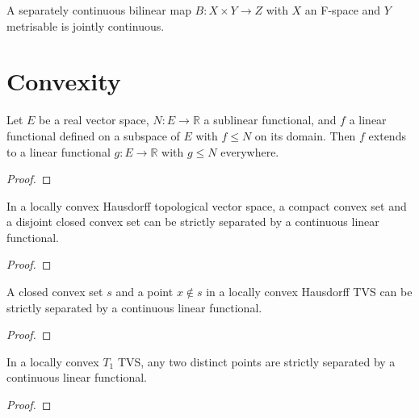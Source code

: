 \begin{theorem}
  \label{thm:bilinear-cont-of-separately}
  \leanok
  A separately continuous bilinear map $B : X \times Y \to Z$ with
  $X$ an F-space and $Y$ metrisable is jointly continuous.
\end{theorem}

\chapter{Convexity}

\begin{theorem}
  \label{thm:hahn-banach-analytic}
  \leanok
  Let $E$ be a real vector space, $N\colon E \to \mathbb{R}$ a sublinear
  functional, and $f$ a linear functional defined on a subspace of $E$
  with $f \le N$ on its domain. Then $f$ extends to a linear functional
  $g\colon E \to \mathbb{R}$ with $g \le N$ everywhere.
\end{theorem}
\begin{proof}
  \leanok
\end{proof}

\begin{theorem}
  \label{thm:hahn-banach-separation}
  \leanok
  In a locally convex Hausdorff topological vector space, a compact
  convex set and a disjoint closed convex set can be strictly separated
  by a continuous linear functional.
\end{theorem}
\begin{proof}
  \leanok
\end{proof}

\begin{theorem}
  \label{thm:hahn-banach-closed-point}
  \leanok
  A closed convex set $s$ and a point $x \notin s$ in a locally convex
  Hausdorff TVS can be strictly separated by a continuous linear
  functional.
\end{theorem}
\begin{proof}
  \leanok
\end{proof}

\begin{theorem}
  \label{thm:hahn-banach-point-point}
  \leanok
  In a locally convex $T_1$ TVS, any two distinct points are strictly
  separated by a continuous linear functional.
\end{theorem}
\begin{proof}
  \leanok
\end{proof}

